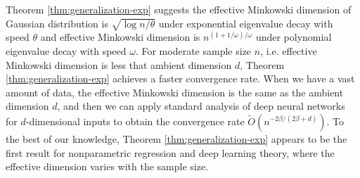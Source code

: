 Theorem \ref{thm:generalization-exp} suggests the effective Minkowski dimension of Gaussian distribution is $\sqrt{\log n/\theta}$ under exponential eigenvalue decay with speed $\theta$ and effective Minkowski dimension is $n^{(1+1/\omega)/\omega}$ under polynomial eigenvalue decay with speed $\omega$. For moderate sample size $n$, i.e. effective Minkowski dimension is less that ambient dimension $d$, Theorem \ref{thm:generalization-exp} achieves a faster convergence rate.  When we have a vast amount of data, the effective Minkowski dimension is the same as the ambient dimension $d$, and then we can apply standard analysis of deep neural networks for $d$-dimensional inputs to obtain the convergence rate  $\tilde{O}(n^{-2\beta/(2\beta+d)})$. To the best of our knowledge, Theorem \ref{thm:generalization-exp} appears to be the first result for nonparametric regression and deep learning theory, where the effective dimension varies with the sample size.





